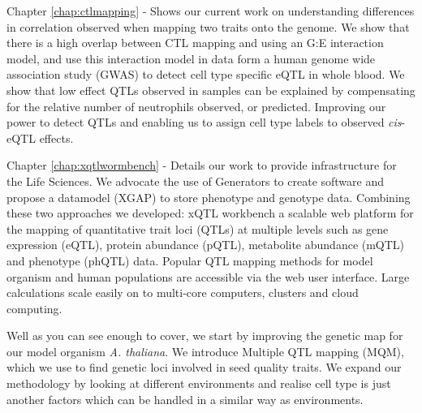 Chapter \ref{chap:ctlmapping} -  Shows our current work on understanding differences in 
correlation observed when mapping two traits onto the genome. We show that there is a high 
overlap between CTL mapping and using an G:E interaction model, and use this interaction 
model in data form a human genome wide association study (GWAS) to detect cell type specific 
eQTL in whole blood. We show that low effect QTLs observed in samples can be explained by 
compensating for the relative number of neutrophils observed, or predicted. Improving our 
power to detect QTLs and enabling us to assign cell type labels to observed \emph{cis}-eQTL 
effects.

Chapter \ref{chap:xqtlwormbench} - Details our work to provide infrastructure for the Life 
Sciences. We advocate the use of Generators to create software and propose a datamodel (XGAP) 
to store phenotype and genotype data. Combining these two approaches we developed: xQTL 
workbench a scalable web platform for the mapping of quantitative trait loci (QTLs) at 
multiple levels such as gene expression (eQTL), protein abundance (pQTL), metabolite 
abundance (mQTL) and phenotype (phQTL) data. Popular QTL mapping methods for model organism 
and human populations are accessible via the web user interface. Large calculations scale 
easily on to multi-core computers, clusters and cloud computing.

Well as you can see enough to cover, we start by improving the genetic map for our model organism 
\emph{A. thaliana}. We introduce Multiple QTL mapping (MQM), which we use to find genetic loci 
involved in seed quality traits. We expand our methodology by looking at different environments 
and realise cell type is just another factors which can be handled in a similar way as environments.

